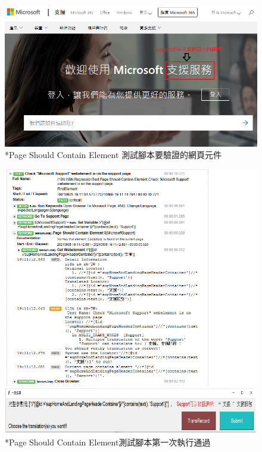 \begin{figure}[H]
\includegraphics[width= \textwidth]{../論文截圖/4-1-9 Page should contain element要驗證的網頁元件.png}
\caption{*Page Should Contain Element 測試腳本要驗證的網頁元件}
\end{figure}

\begin{figure}[H]
\includegraphics[width= \textwidth]{../論文截圖/4.1.5-2 page should contain element 1st run.png}
\caption{*Page Should Contain Element測試腳本第一次執行通過}
\end{figure}

